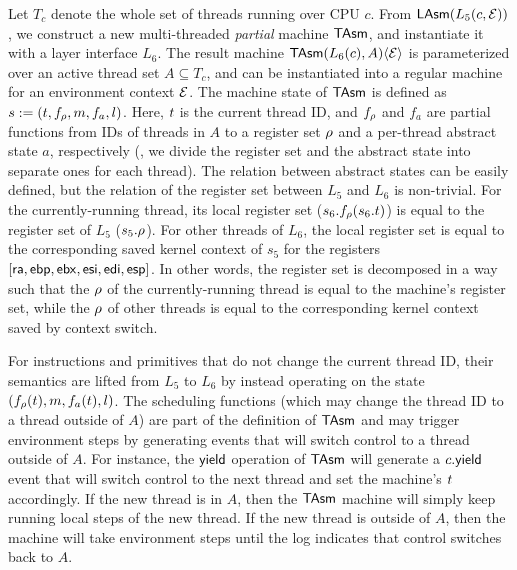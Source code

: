 Let $T_c$ denote the whole set of threads running over CPU $c$.
From $\mathsf{LAsm}(L_5(c,\mathcal{E}))$, we construct a new 
multi-threaded \emph{partial} machine $\mathsf{TAsm}$,
and instantiate it with a layer interface $L_6$.
The result machine 
$\mathsf{TAsm}(L_6(c), A)\langle \mathcal{E} \rangle$ is 
parameterized over an active thread set $A \subseteq T_c$,
and can be instantiated into a regular machine for
an environment context $\mathcal{E}$.
The machine state of $\mathsf{TAsm}$ is defined as $s:=(t, f_\rho, m, f_a, l)$.
Here, $t$ is the current thread ID, and
$f_\rho$ and $f_a$ are partial functions
from IDs of threads in $A$ to a register set $\rho$
and a per-thread abstract state $a$, respectively (\ie,
we divide the register set and the abstract state
into separate ones for each thread).
The relation between abstract states
can be easily defined, but the relation of the register set between $L_5$ and $L_6$ is non-trivial.
For the currently-running thread, its local register set ($s_6.f_\rho(s_6.t)$) is equal
to the register set of $L_5$ ($s_5.\rho$).
For other threads of $L_6$, the local register set is equal
to the corresponding saved kernel context of $s_5$ for the registers
$[\mathsf{ra}, \mathsf{ebp}, \mathsf{ebx}, \mathsf{esi}, \mathsf{edi}, \mathsf{esp}]$.
In other words, the register set is decomposed in a way such that the $\rho$ of the
currently-running thread is equal to the machine's register set, while the $\rho$ of
other threads is equal to the corresponding kernel context saved by context switch.


For instructions and primitives that do not change the current thread
ID, their semantics are lifted from $L_5$ to $L_6$
by instead operating on the state $(f_\rho(t), m, f_a(t), l)$.
The scheduling functions (which may change the thread ID to a thread outside of $A$)
are part of the definition of $\mathsf{TAsm}$
and may trigger environment steps by generating events
that will switch control to a thread outside of $A$.
For instance,
the $\mathsf{yield}$ operation of $\mathsf{TAsm}$
will generate a $c.\mathsf{yield}$ event that will switch control to the next thread
and set the machine's $t$ accordingly.
If the new thread is in $A$,
then the $\mathsf{TAsm}$ machine will simply keep running local steps of the new thread.
If the new thread is outside of $A$,
then the machine will take environment steps
until the log indicates that control switches back to  $A$.

